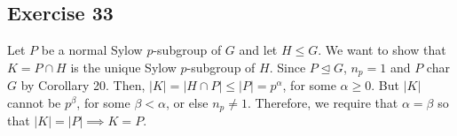 \subsection*{Exercise 33}
Let $P$ be a normal Sylow $p$-subgroup of $G$ and let $H \le G$. We want to show that $K = P \cap H$ is the unique Sylow $p$-subgroup of $H$. Since $P \trianglelefteq G$, $n_p = 1$ and $P$ char $G$ by Corollary 20. Then, $|K| = |H \cap P| \le |P| = p^\alpha$, for some $\alpha \ge 0$. But $|K|$ cannot be $p^\beta$, for some $\beta < \alpha$, or else $n_p \not= 1$. Therefore, we require that $\alpha = \beta$ so that $|K| = |P| \implies K = P$.